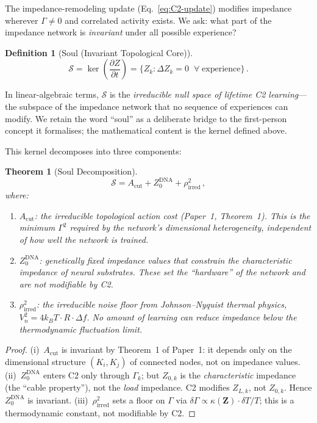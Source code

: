 \documentclass[aps,pre,twocolumn,superscriptaddress,floatfix]{revtex4-2}
\newtheorem{theorem}{Theorem}
\newtheorem{definition}{Definition}
\newcommand{\Acut}{A_{\text{cut}}}
\begin{document}
The impedance-remodeling update (Eq.~\ref{eq:C2-update}) modifies impedance
wherever $\Gamma\neq 0$ and correlated activity exists.
We ask: what part of the impedance network is \emph{invariant}
under all possible experience?

\begin{definition}[Soul (Invariant Topological Core)]
\begin{equation}
  \mathcal{S} = \ker\!\left(\frac{\partial Z}{\partial t}\right)
  = \{Z_k : \Delta Z_k = 0\;\;\forall\;\text{experience}\}\,.
  \label{eq:soul}
\end{equation}
\end{definition}
\noindent
In linear-algebraic terms, $\mathcal{S}$ is the
\emph{irreducible null space of lifetime C2 learning}---the
subspace of the impedance network that no sequence of
experiences can modify.
We retain the word ``soul'' as a deliberate bridge to the
first-person concept it formalises; the mathematical
content is the kernel defined above.

This kernel decomposes into three components:

\begin{theorem}[Soul Decomposition]
\label{thm:soul-decomp}
\begin{equation}
  \mathcal{S} = \Acut + Z_0^{\text{DNA}} + \rho_{\text{irred}}^2\,,
  \label{eq:soul-decomposition}
\end{equation}
where:
\begin{enumerate}
  \item $\Acut$: the irreducible topological action cost
    (Paper~1, Theorem~1).  This is the minimum $\Gamma^2$
    required by the network's dimensional heterogeneity,
    independent of how well the network is trained.
  \item $Z_0^{\text{DNA}}$: genetically fixed impedance
    values that constrain the characteristic impedance of
    neural substrates.  These set the ``hardware'' of the
    network and are not modifiable by C2.
  \item $\rho_{\text{irred}}^2$: the irreducible noise floor
    from Johnson--Nyquist thermal physics,
    $V_n^2=4k_BT\cdot R\cdot\Delta f$.
    No amount of learning can reduce impedance below the
    thermodynamic fluctuation limit.
\end{enumerate}
\end{theorem}

\begin{proof}
(i)~$\Acut$ is invariant by Theorem~1 of Paper~1: it depends
only on the dimensional structure $(K_i,K_j)$ of connected
nodes, not on impedance values.
(ii)~$Z_0^{\text{DNA}}$ enters C2 only through $\Gamma_k$;
but $Z_{0,k}$ is the \emph{characteristic} impedance
(the ``cable property''), not the \emph{load} impedance.
C2 modifies $Z_{L,k}$, not $Z_{0,k}$.
Hence $Z_0^{\text{DNA}}$ is invariant.
(iii)~$\rho_{\text{irred}}^2$ sets a floor on $\Gamma$ via
$\delta\Gamma\propto\kappa(\mathbf{Z})\cdot\delta T/T$;
this is a thermodynamic constant, not modifiable by C2.
\end{proof}
\end{document}
